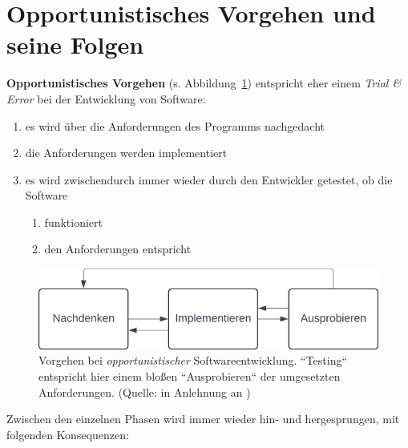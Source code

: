 \section{Opportunistisches Vorgehen und seine Folgen}

\textbf{Opportunistisches Vorgehen} (s. Abbildung~\ref{fig:opportunistischeentwicklung}) entspricht eher einem \textit{Trial \& Error} bei der Entwicklung von Software:

\begin{enumerate}
    \item es wird über die Anforderungen des Programms nachgedacht
    \item die Anforderungen werden implementiert
    \item es wird zwischendurch immer wieder durch den Entwickler getestet, ob die Software
        \begin{enumerate}
            \item funktioniert
            \item den Anforderungen entspricht
        \end{enumerate}
\end{enumerate}


\begin{figure}
    \centering
    \includegraphics[scale=0.4]{chapters/Uebersicht ueber die Phasen des Entwicklungszyklus/img/opportunistischeentwicklung}
    \caption{Vorgehen bei \textit{opportunistischer} Softwareentwicklung. ``Testing`` entspricht hier einem bloßen ``Ausprobieren`` der umgesetzten Anforderungen. (Quelle: in Anlehnung an \cite[14, Abb. 2.1]{Wed09})}
    \label{fig:opportunistischeentwicklung}
\end{figure}

\noindent
Zwischen den einzelnen Phasen wird immer wieder hin- und hergesprungen, mit folgenden Konsequenzen:


